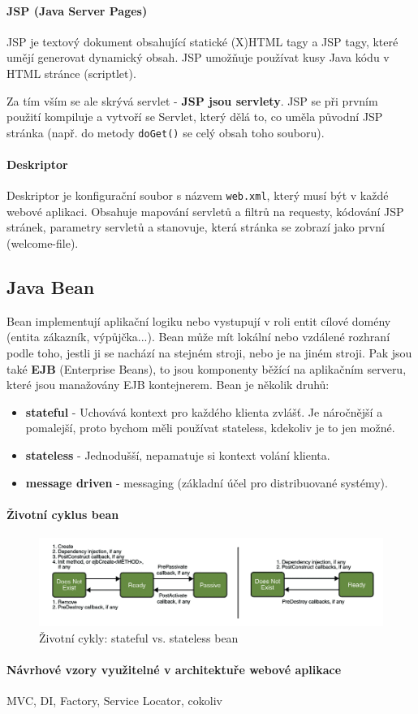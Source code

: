 \vspace{-20px}

\paragraph{JSP (Java Server Pages)}
JSP je textový dokument obsahující statické (X)HTML tagy a JSP tagy, které umějí generovat dynamický obsah. JSP umožňuje používat kusy Java kódu v HTML stránce (scriptlet).

Za tím vším se ale skrývá servlet - \textbf{JSP jsou servlety}. JSP se při prvním použití kompiluje a vytvoří se Servlet, který dělá to, co uměla původní JSP stránka (např. do metody \texttt{doGet()} se  celý obsah toho souboru).

\paragraph{Deskriptor} Deskriptor je konfigurační soubor s názvem \texttt{web.xml}, který musí být v každé webové aplikaci. Obsahuje mapování servletů a filtrů na requesty, kódování JSP stránek, parametry servletů a stanovuje, která stránka se zobrazí jako první (welcome-file).

\subsection{Java Bean}
Bean implementují aplikační logiku nebo vystupují v roli entit cílové domény (entita zákazník, výpůjčka...). Bean může mít lokální nebo vzdálené rozhraní podle toho, jestli ji se nachází na stejném stroji, nebo je na jiném stroji. Pak jsou také \textbf{EJB} (Enterprise Beans), to jsou komponenty běžící na aplikačním serveru, které jsou manažovány EJB kontejnerem. Bean je několik druhů:

\begin{itemize}[itemsep=0px]
\item \textbf{stateful} - Uchovává kontext pro každého klienta zvlášť. Je náročnější a pomalejší, proto bychom měli používat stateless, kdekoliv je to jen možné.
\item \textbf{stateless} - Jednodušší, nepamatuje si kontext volání klienta.
\item \textbf{message driven} - messaging (základní účel pro distribuované systémy).
\end{itemize}

\paragraph{Životní cyklus bean}

\begin{figure}[h!]
\centering
\includegraphics[width=140mm]{16/images/ejb-lifecycle}
\caption*{Životní cykly: stateful vs. stateless bean}
\end{figure}

\paragraph{Návrhové vzory využitelné v architektuře webové aplikace}
MVC, DI, Factory, Service Locator, cokoliv
